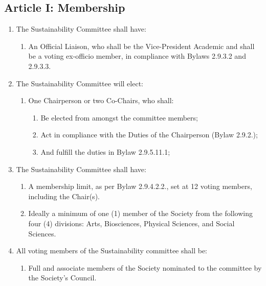 \subsection{Article I: Membership}
\begin{enumerate}[label*=\arabic*., align=left]	
\item The Sustainability Committee shall have:
\begin{enumerate}[label*=\arabic*., align=left]	
\item An Official Liaison, who shall be the Vice-President Academic and shall be a voting ex-officio member, in compliance with Bylaws 2.9.3.2 and 2.9.3.3.
\end{enumerate}
\item The Sustainability Committee will elect:
\begin{enumerate}[label*=\arabic*., align=left]
\item One Chairperson or two Co-Chairs, who shall:
\begin{enumerate}[label*=\arabic*., align=left]
\item Be elected from amongst the committee members;
\item Act in compliance with the Duties of the Chairperson (Bylaw 2.9.2.);
\item And fulfill the duties in Bylaw 2.9.5.11.1;
\end{enumerate}
\end{enumerate}
\item The Sustainability Committee shall have:
\begin{enumerate}[label*=\arabic*., align=left]
\item A membership limit, as per Bylaw 2.9.4.2.2., set at 12 voting members, including the Chair(s).
\item Ideally a minimum of one (1) member of the Society from the following four (4) divisions: Arts, Biosciences, Physical Sciences, and Social Sciences.
\end{enumerate}
\item All voting members of the Sustainability committee shall be:
\begin{enumerate}[label*=\arabic*., align=left]
\item Full and associate members of the Society nominated to the committee by the Society’s Council.  
\end{enumerate}
\end{enumerate}

